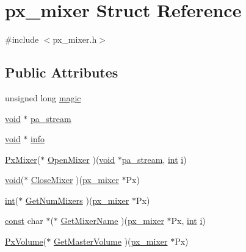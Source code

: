 \hypertarget{structpx__mixer}{}\section{px\+\_\+mixer Struct Reference}
\label{structpx__mixer}


{\ttfamily \#include $<$px\+\_\+mixer.\+h$>$}

\subsection*{Public Attributes}
\begin{DoxyCompactItemize}
\item 
unsigned long \hyperlink{structpx__mixer_a4fd07c2c6246525809f464a965d22669}{magic}
\item 
\hyperlink{sound_8c_ae35f5844602719cf66324f4de2a658b3}{void} $\ast$ \hyperlink{structpx__mixer_a1a383cd6937c83a4361c5a07a58775d7}{pa\+\_\+stream}
\item 
\hyperlink{sound_8c_ae35f5844602719cf66324f4de2a658b3}{void} $\ast$ \hyperlink{structpx__mixer_a9ee425600125f7a11e386c15b96707ab}{info}
\item 
\hyperlink{portmixer_8h_a1928e1cfc2264146e581912ac5836c45}{Px\+Mixer}($\ast$ \hyperlink{structpx__mixer_aa30b3ee0d86e178ab6b5091bc25b7b68}{Open\+Mixer} )(\hyperlink{sound_8c_ae35f5844602719cf66324f4de2a658b3}{void} $\ast$\hyperlink{structpx__mixer_a1a383cd6937c83a4361c5a07a58775d7}{pa\+\_\+stream}, \hyperlink{xmltok_8h_a5a0d4a5641ce434f1d23533f2b2e6653}{int} \hyperlink{checksum_8c_ab80e330a3bc9e38c1297fe17381e92b4}{i})
\item 
\hyperlink{sound_8c_ae35f5844602719cf66324f4de2a658b3}{void}($\ast$ \hyperlink{structpx__mixer_a3102e9061c74070f2e3f6151c819913a}{Close\+Mixer} )(\hyperlink{structpx__mixer}{px\+\_\+mixer} $\ast$Px)
\item 
\hyperlink{xmltok_8h_a5a0d4a5641ce434f1d23533f2b2e6653}{int}($\ast$ \hyperlink{structpx__mixer_add0b06f3a6310d98302608ac01f9244d}{Get\+Num\+Mixers} )(\hyperlink{structpx__mixer}{px\+\_\+mixer} $\ast$Px)
\item 
\hyperlink{getopt1_8c_a2c212835823e3c54a8ab6d95c652660e}{const} char $\ast$($\ast$ \hyperlink{structpx__mixer_a8028b247e6c2cb8ddc35a0523bf777f7}{Get\+Mixer\+Name} )(\hyperlink{structpx__mixer}{px\+\_\+mixer} $\ast$Px, \hyperlink{xmltok_8h_a5a0d4a5641ce434f1d23533f2b2e6653}{int} \hyperlink{checksum_8c_ab80e330a3bc9e38c1297fe17381e92b4}{i})
\item 
\hyperlink{portmixer_8h_a9353e1a36e40ffe275fbea0105e39dad}{Px\+Volume}($\ast$ \hyperlink{structpx__mixer_a12d44993a8d09ae8b24242728da9ffa9}{Get\+Master\+Volume} )(\hyperlink{structpx__mixer}{px\+\_\+mixer} $\ast$Px)

\end{DoxyCompactItemize}
